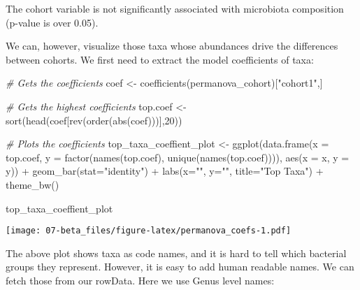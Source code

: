 \documentclass[
  oneside]{book}
\newenvironment{Shaded}{\begin{snugshade}}{\end{snugshade}}
\newcommand{\AttributeTok}[1]{\textcolor[rgb]{0.77,0.63,0.00}{#1}}
\newcommand{\CommentTok}[1]{\textcolor[rgb]{0.56,0.35,0.01}{\textit{#1}}}
\newcommand{\DecValTok}[1]{\textcolor[rgb]{0.00,0.00,0.81}{#1}}
\newcommand{\FunctionTok}[1]{\textcolor[rgb]{0.00,0.00,0.00}{#1}}
\newcommand{\NormalTok}[1]{#1}
\newcommand{\OtherTok}[1]{\textcolor[rgb]{0.56,0.35,0.01}{#1}}
\newcommand{\SpecialCharTok}[1]{\textcolor[rgb]{0.00,0.00,0.00}{#1}}
\newcommand{\StringTok}[1]{\textcolor[rgb]{0.31,0.60,0.02}{#1}}
\begin{document}
The cohort variable is not significantly associated with
microbiota composition (p-value is over 0.05).

We can, however, visualize those taxa whose abundances drive the
differences between cohorts. We first need to extract the model
coefficients of taxa:

\begin{Shaded}
\begin{Highlighting}[]
\CommentTok{\# Gets the coefficients}
\NormalTok{coef }\OtherTok{\textless{}{-}} \FunctionTok{coefficients}\NormalTok{(permanova\_cohort)[}\StringTok{"cohort1"}\NormalTok{,]}

\CommentTok{\# Gets the highest coefficients}
\NormalTok{top.coef }\OtherTok{\textless{}{-}} \FunctionTok{sort}\NormalTok{(}\FunctionTok{head}\NormalTok{(coef[}\FunctionTok{rev}\NormalTok{(}\FunctionTok{order}\NormalTok{(}\FunctionTok{abs}\NormalTok{(coef)))],}\DecValTok{20}\NormalTok{))}

\CommentTok{\# Plots the coefficients}
\NormalTok{top\_taxa\_coeffient\_plot }\OtherTok{\textless{}{-}} \FunctionTok{ggplot}\NormalTok{(}\FunctionTok{data.frame}\NormalTok{(}\AttributeTok{x =}\NormalTok{ top.coef,}
                                             \AttributeTok{y =} \FunctionTok{factor}\NormalTok{(}\FunctionTok{names}\NormalTok{(top.coef),}
                         \FunctionTok{unique}\NormalTok{(}\FunctionTok{names}\NormalTok{(top.coef)))),}
                                  \FunctionTok{aes}\NormalTok{(}\AttributeTok{x =}\NormalTok{ x, }\AttributeTok{y =}\NormalTok{ y)) }\SpecialCharTok{+}
  \FunctionTok{geom\_bar}\NormalTok{(}\AttributeTok{stat=}\StringTok{"identity"}\NormalTok{) }\SpecialCharTok{+}
  \FunctionTok{labs}\NormalTok{(}\AttributeTok{x=}\StringTok{""}\NormalTok{, }\AttributeTok{y=}\StringTok{""}\NormalTok{, }\AttributeTok{title=}\StringTok{"Top Taxa"}\NormalTok{) }\SpecialCharTok{+}
  \FunctionTok{theme\_bw}\NormalTok{()}

\NormalTok{top\_taxa\_coeffient\_plot}
\end{Highlighting}
\end{Shaded}

\texttt{[image: 07-beta\_files/figure-latex/permanova\_coefs-1.pdf]}

The above plot shows taxa as code names, and it is hard to tell which
bacterial groups they represent. However, it is easy to add human readable
names. We can fetch those from our rowData. Here we use Genus level names:
\end{document}
